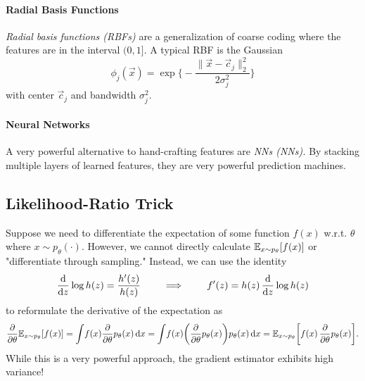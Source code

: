 			\paragraph{Radial Basis Functions}
				\emph{Radial basis functions (\acsp{RBF})} are a generalization of coarse coding where the features are in the interval \((0, 1]\). A typical \ac{RBF} is the Gaussian
				\begin{equation}
					\phi_j(\vec{x}) = \exp\Biggl\{ -\frac{\lVert \vec{x} - \vec{c}_j \rVert_2^2}{2 \sigma_j^2} \Biggr\}
				\end{equation}
				with center \(\vec{c}_j\) and bandwidth \( \sigma_j^2 \).

			\paragraph{Neural Networks}
				A very powerful alternative to hand-crafting features are \emph{\aclp{NN} (\acsp{NN}).} By stacking multiple layers of learned features, they are very powerful prediction machines.

		\subsection{Likelihood-Ratio Trick}
			Suppose we need to differentiate the expectation of some function \( f(x) \) w.r.t. \(\theta\) where \( x \sim p_\theta(\cdot) \). However, we cannot directly calculate \( \mathbb{E}_{x \sim p_\theta}[f(x)] \) or "differentiate through sampling." Instead, we can use the identity
			\begin{equation}
				\dv{z} \log h(z) = \frac{h'(z)}{h(z)}
				\qquad\implies\qquad
				f'(z) = h(z) \, \dv{z} \log h(z)
			\end{equation}
			to reformulate the derivative of the expectation as
			\begin{equation}
				\pdv{\theta} \mathbb{E}_{x \sim p_\theta}[f(x)]
					= \int\! f(x) \pdv{\theta} p_\theta(x) \dd{x}
					= \int\! f(x) \biggl( \pdv{\theta} p_\theta(x) \biggr) p_\theta(x) \dd{x}
					= \mathbb{E}_{x \sim p_\theta} \biggl[ f(x) \, \pdv{\theta} p_\theta(x) \biggr].
			\end{equation}
			While this is a very powerful approach, the gradient estimator exhibits high variance!

